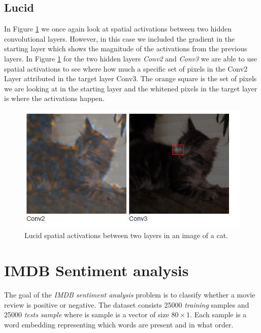 \subsection{Lucid}
In Figure \ref{fig:lucid-cat} we once again look at spatial activations between two hidden convolutional layers. However, in this case we included the gradient in the starting layer which shows the magnitude of the activations from the previous layers. In Figure \ref{fig:lucid-cat} for the two hidden layers \emph{Conv2} and \emph{Conv3} we are able to use spatial activations to see where how much a specific set of pixels in the Conv2 Layer attributed in the target layer Conv3. The orange square is the set of pixels we are looking at in the starting layer and the whitened pixels in the target layer is where the activations happen.
\begin  {figure}[!htpb]
  \includegraphics[width=\linewidth]{Evaluation_Images/LUCID_CATS_DOGS_2_v2.png}
  \caption{Lucid spatial activations between two layers in an image of a cat.}
  \label{fig:lucid-cat}
\end{figure}

\section{IMDB Sentiment analysis}
The goal of the \emph{IMDB sentiment analysis} problem is to classify whether a movie review is positive or negative. The dataset consists 25000 \emph{training} samples and 25000 \emph{tests sample} where is sample is a vector of size $80\times1$. Each sample is a word embedding representing which words are present and in what order.

